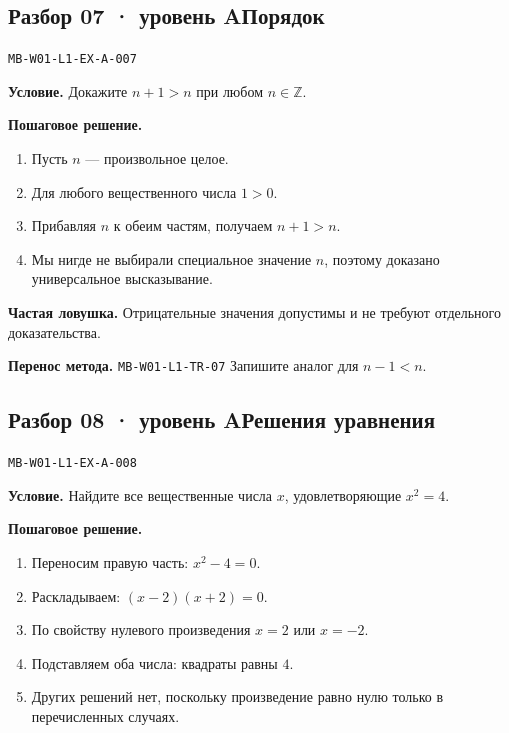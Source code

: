 \documentclass[11pt,a4paper,openany]{book}
\newcommand{\mtag}[1]{\textsf{\small\color{mbaccent}\bfseries #1}}
\newcommand{\muid}[1]{\texttt{\footnotesize #1}}
\begin{document}
\subsection*{\mtag{Разбор 07 · уровень A}\quad Порядок}\hypertarget{MB-W01-L1-EX-A-007}{}

\muid{MB-W01-L1-EX-A-007}\par

\begin{keybox}\textbf{Условие.} Докажите $n+1>n$ при любом $n\in\mathbb Z$.\end{keybox}

\textbf{Пошаговое решение.}\par
\begin{enumerate}[label=\arabic*),leftmargin=*,itemsep=3pt,topsep=4pt]
\item Пусть $n$ — произвольное целое.
\item Для любого вещественного числа $1>0$.
\item Прибавляя $n$ к обеим частям, получаем $n+1>n$.
\item Мы нигде не выбирали специальное значение $n$, поэтому доказано универсальное высказывание.
\end{enumerate}


\begin{learnbox}\textbf{Частая ловушка.} Отрицательные значения допустимы и не требуют отдельного доказательства.\par \textbf{Перенос метода.} \muid{MB-W01-L1-TR-07} Запишите аналог для $n-1<n$.\end{learnbox}

\subsection*{\mtag{Разбор 08 · уровень A}\quad Решения уравнения}\hypertarget{MB-W01-L1-EX-A-008}{}

\muid{MB-W01-L1-EX-A-008}\par

\begin{keybox}\textbf{Условие.} Найдите все вещественные числа $x$, удовлетворяющие $x^2=4$.\end{keybox}

\textbf{Пошаговое решение.}\par
\begin{enumerate}[label=\arabic*),leftmargin=*,itemsep=3pt,topsep=4pt]
\item Переносим правую часть: $x^2-4=0$.
\item Раскладываем: $(x-2)(x+2)=0$.
\item По свойству нулевого произведения $x=2$ или $x=-2$.
\item Подставляем оба числа: квадраты равны $4$.
\item Других решений нет, поскольку произведение равно нулю только в перечисленных случаях.
\end{enumerate}
\end{document}
